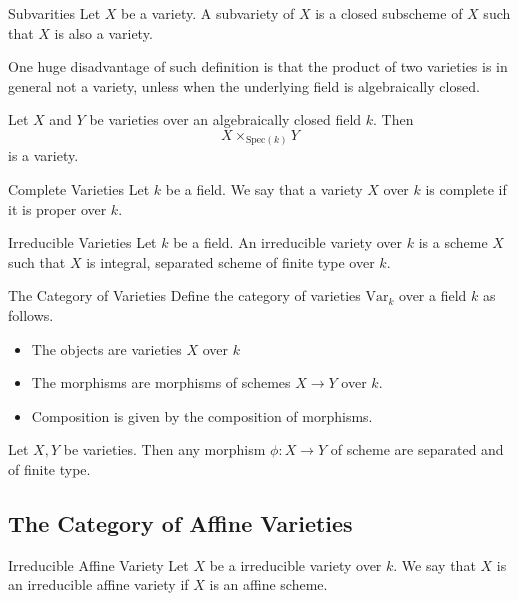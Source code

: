 \documentclass[a4paper]{article}
\begin{document}
\begin{defn}{Subvarities}{} Let $X$ be a variety. A subvariety of $X$ is a closed subscheme of $X$ such that $X$ is also a variety. 
\end{defn}

One huge disadvantage of such definition is that the product of two varieties is in general not a variety, unless when the underlying field is algebraically closed. 

\begin{prp}{}{} Let $X$ and $Y$ be varieties over an algebraically closed field $k$. Then $$X\times_{\text{Spec}(k)}Y$$ is a variety. 
\end{prp}

\begin{defn}{Complete Varieties}{} Let $k$ be a field. We say that a variety $X$ over $k$ is complete if it is proper over $k$. 
\end{defn}

\begin{defn}{Irreducible Varieties}{} Let $k$ be a field. An irreducible variety over $k$ is a scheme $X$ such that $X$ is integral, separated scheme of finite type over $k$. 
\end{defn}

\begin{defn}{The Category of Varieties}{} Define the category of varieties $\text{Var}_k$ over a field $k$ as follows. 
\begin{itemize}
\item The objects are varieties $X$ over $k$
\item The morphisms are morphisms of schemes $X\to Y$ over $k$. 
\item Composition is given by the composition of morphisms. 
\end{itemize}
\end{defn}

\begin{prp}{}{} Let $X,Y$ be varieties. Then any morphism $\phi:X\to Y$ of scheme are separated and of finite type. 
\end{prp}

\subsection{The Category of Affine Varieties}
\begin{defn}{Irreducible Affine Variety}{} Let $X$ be a irreducible variety over $k$. We say that $X$ is an irreducible affine variety if $X$ is an affine scheme. 
\end{defn}
\end{document}
